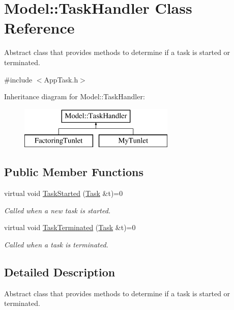 \hypertarget{class_model_1_1_task_handler}{\section{Model\-:\-:Task\-Handler Class Reference}
\label{class_model_1_1_task_handler}
}


Abstract class that provides methods to determine if a task is started or terminated.  




{\ttfamily \#include $<$App\-Task.\-h$>$}

Inheritance diagram for Model\-:\-:Task\-Handler\-:\begin{figure}[H]
\begin{center}
\leavevmode
\includegraphics[height=2.000000cm]{class_model_1_1_task_handler}
\end{center}
\end{figure}
\subsection*{Public Member Functions}
\begin{DoxyCompactItemize}
\item 
virtual void \hyperlink{class_model_1_1_task_handler_a357c8d730fd4e95582f99046d3474dae}{Task\-Started} (\hyperlink{class_model_1_1_task}{Task} \&t)=0
\begin{DoxyCompactList}\small\item\em Called when a new task is started. \end{DoxyCompactList}\item 
virtual void \hyperlink{class_model_1_1_task_handler_a7c19d0ad21f0cd431ee31f022a7455b7}{Task\-Terminated} (\hyperlink{class_model_1_1_task}{Task} \&t)=0
\begin{DoxyCompactList}\small\item\em Called when a task is terminated. \end{DoxyCompactList}\end{DoxyCompactItemize}


\subsection{Detailed Description}
Abstract class that provides methods to determine if a task is started or terminated. 

